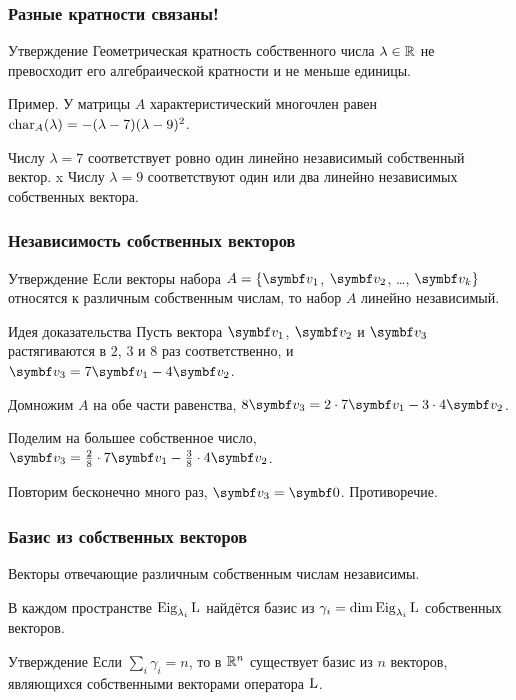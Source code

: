 \begin{frame}
\frametitle{Разные кратности связаны!}

\begin{block}{Утверждение}
    Геометрическая кратность собственного числа $\lambda\in \mathbb{R}$ не превосходит его алгебраической кратности и не меньше единицы.     
\end{block}

\pause
Пример. У матрицы $A$ характеристический многочлен равен $\operatorname{char}_A(\lambda) = -(\lambda- 7)(\lambda - 9)^2$. \pause

Числу $\lambda =7$ соответствует ровно один линейно независимый собственный вектор.\pause
x
Числу $\lambda =9$ соответствуют один или два линейно независимых собственных вектора. 

\end{frame}


\begin{frame}
    \frametitle{Независимость собственных векторов}

    \begin{block}{Утверждение}
        Если векторы набора $A = \{\bv_1$, $\bv_2$, \ldots, $\bv_k\}$ относятся к различным
        собственным числам, то набор $A$ линейно независимый.
    \end{block}
    \pause
    \begin{block}{Идея доказательства}
        Пусть вектора $\bv_1$, $\bv_2$ и $\bv_3$ растягиваются в $2$, $3$ и $8$ раз соответственно, 
        и $\bv_3 = 7\bv_1 - 4 \bv_2$.\pause

        Домножим $A$ на обе части равенства, $8\bv_3 = 2 \cdot 7\bv_1 - 3\cdot 4\bv_2$.\pause

        Поделим на большее собственное число, $\bv_3 = \frac{2}{8} \cdot 7\bv_1 - \frac{3}{8}\cdot 4\bv_2$. \pause
        
        Повторим бесконечно много раз, $\bv_3 = \bzero$.
        Противоречие.
        
    \end{block}

    

\end{frame}




\begin{frame}
    \frametitle{Базис из собственных векторов}
    Векторы отвечающие различным собственным числам независимы.
    \pause 

    В каждом пространстве $\operatorname{Eig}_{\lambda_i}\operatorname{L}$ найдётся базис из
     $\gamma_i = \dim \operatorname{Eig}_{\lambda_i}\operatorname{L}$ собственных векторов.
     \pause

    \begin{block}{Утверждение}
Если $\sum_i \gamma_i = n$, то в $\mathbb{R}^n$ существует базис 
из $n$ векторов, являющихся собственными векторами оператора $\operatorname{L}$.            
    \end{block}

\end{frame}


